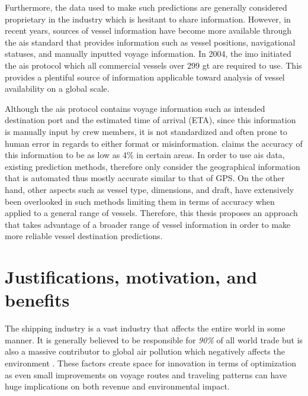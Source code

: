 

Furthermore, the data used to make such predictions are generally considered proprietary in the industry which is hesitant to share information. However, in recent years, sources of vessel information have become more available through the \acrshort{ais} standard that provides information such as vessel positions, navigational statuses, and manually inputted voyage information. In 2004, the \acrfull{imo} initiated the \acrshort{ais} protocol which all commercial vessels over 299 \acrfull{gt} are required to use. This provides a plentiful source of information applicable toward analysis of vessel availability on a global scale.

Although the \acrshort{ais} protocol contains voyage information such as intended destination port and the estimated time of arrival (ETA), since this information is manually input by crew members, it is not standardized and often prone to human error in regards to either format or misinformation. \cite{mestl2016} claims the accuracy of this information to be as low as 4\% in certain areas. In order to use \acrshort{ais} data, existing prediction methods, therefore only consider the geographical information that is automated thus mostly accurate similar to that of GPS\@. On the other hand, other aspects such as vessel type, dimensions, and draft, have extensively been overlooked in such methods limiting them in terms of accuracy when applied to a general range of vessels. Therefore, this thesis proposes an approach that takes advantage of a broader range of vessel information in order to make more reliable vessel destination predictions.

\section{Justifications, motivation, and benefits}
\label{section:justifications_motivations_benefits}

The shipping industry is a vast industry that affects the entire world in some manner. It is generally believed to be responsible for \textit{90\%} of all world trade \parencite{grote2016} but is also a massive contributor to global air pollution which negatively affects the environment \parencite{zheng2016:online}. These factors create space for innovation in terms of optimization as even small improvements on voyage routes and traveling patterns can have huge implications on both revenue and environmental impact.


